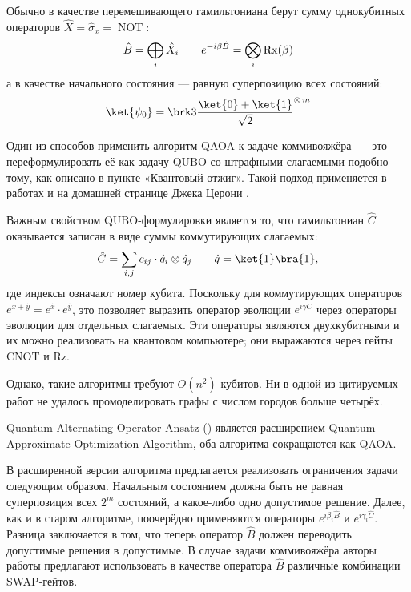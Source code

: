 Обычно в качестве перемешивающего гамильтониана берут сумму однокубитных операторов $\hat X = \hat \sigma_x = \operatorname{NOT}$:
$$
\hat B = \bigoplus_i \hat X_i
\qquad
e^{- i \beta \hat B} = \bigotimes_i \operatorname{Rx}(\beta)
$$
а в качестве начального состояния --- равную суперпозицию всех состояний:
$$
\ket{\psi_0} = 
\brk3{
    \frac{\ket{0} + \ket{1}}{\sqrt 2}
}^{\otimes\, m}
$$


Один из способов применить алгоритм QAOA к задаче коммивояжёра~--- это переформулировать её как задачу QUBO со штрафными слагаемыми подобно тому, как описано в пункте «Квантовый отжиг». Такой подход применяется в работах \cite{Stanford1, stanford2} и на домашней странице Джека Церони \cite{HomePage}.

Важным свойством QUBO-формулировки является то, что гамильтониан $\hat C$ оказывается записан в виде суммы коммутирующих слагаемых:
$$
\hat C = \sum_{i,j} c_{ij} \cdot \hat q_i \otimes \hat q_j
\qquad
\hat q = \ket{1}\bra{1},
$$
где индексы означают номер кубита. 
Поскольку для коммутирующих операторов $e^{\hat x + \hat y} = e^{\hat x} \cdot e^{\hat y}$, это позволяет выразить оператор эволюции $e^{i \gamma \hat C}$ через операторы эволюции для отдельных слагаемых. Эти операторы являются двухкубитными и их можно реализовать на квантовом компьютере; они выражаются через гейты CNOT и Rz.

Однако, такие алгоритмы требуют $O(n^2)$ кубитов. Ни в одной из цитируемых работ не удалось промоделировать графы с числом городов больше четырёх. 


Quantum Alternating Operator Ansatz \cite{Alternating} (\citeyear{Alternating}) является расширением Quantum Approximate Optimization Algorithm, оба алгоритма сокращаются как QAOA.

В расширенной версии алгоритма предлагается реализовать ограничения задачи следующим образом. Начальным состоянием должна быть не равная суперпозиция всех $2^m$ состояний, а какое-либо одно допустимое решение. Далее, как и в старом алгоритме, поочерёдно применяются операторы $e^{i \beta_i \hat B}$ и $e^{i \gamma_i \hat C}$. Разница заключается в том, что теперь оператор $\hat B$ должен переводить допустимые решения в допустимые. В случае задачи коммивояжёра авторы работы \cite{Alternating} предлагают использовать в качестве оператора $\hat B$ различные комбинации SWAP-гейтов. 

